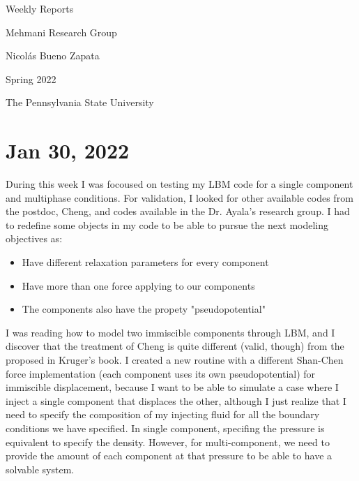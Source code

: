 \documentclass[12pt]{article}
\begin{document}
	\begin{titlepage}
		\begin{center}
			\vspace*{5cm}
			
			\Huge{Weekly Reports}
			
			\vspace{0.5cm}
			\LARGE{Mehmani Research Group}
			
			\vspace{3 cm}
			\Large{}
			
			\vspace{0.25cm}
			\large{Nicolás Bueno Zapata}
			
			\vspace{3 cm}
			\Large{Spring 2022}
			
			\vspace{0.25 cm}
			\Large{The Pennsylvania State University}
			
			
			\vfill
		\end{center}
	\end{titlepage}
	
	\setcounter{page}{2}
	\pagestyle{fancy}
	\fancyhf{}
	\rhead{\thepage}
	
	\section*{Jan 30, 2022}
	 During this week I was focoused on testing my LBM code for a single component and multiphase conditions. For validation, I looked for other available codes from the postdoc, Cheng, and codes available in the Dr. Ayala's research group. I had to redefine some objects in my code to be able to pursue the next modeling objectives as:
		
	\begin{itemize}
		\item Have different relaxation parameters for every component
		\item Have more than one force applying to our components 
		\item The components also have the propety "pseudopotential"

	\end{itemize}

	I was reading how to model two immiscible components through LBM, and I discover that the treatment of Cheng is quite different (valid, though) from the proposed in Kruger's book. I created a new routine with a different Shan-Chen force implementation (each component uses its own pseudopotential) for immiscible displacement, because I want to be able to simulate a case where I inject a single component that displaces the other, although I just realize that I need to specify the composition of my injecting fluid for all the boundary conditions we have specified. In single component, specifing the pressure is equivalent to specify the density. However, for multi-component, we need to provide the amount of each component at that pressure to be able to have a solvable system.
	
\end{document}

